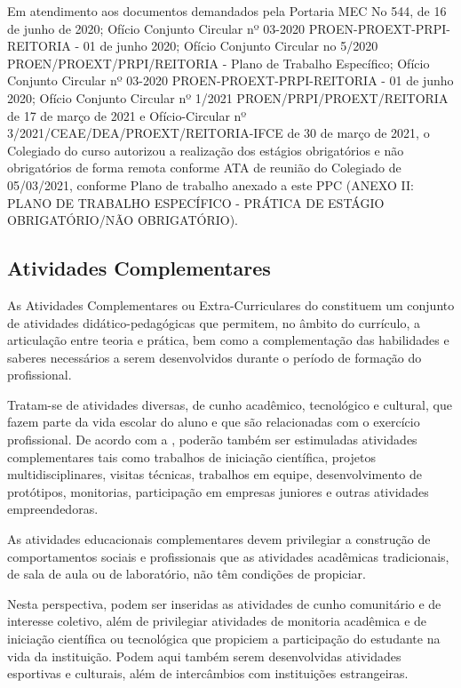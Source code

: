 Em atendimento aos documentos demandados pela Portaria MEC No 544, de 16 de junho de 2020; Ofício Conjunto Circular nº 03-2020 PROEN-PROEXT-PRPI-REITORIA - 01 de junho 2020; Ofício Conjunto Circular no 5/2020 PROEN/PROEXT/PRPI/REITORIA - Plano de Trabalho Específico; Ofício Conjunto Circular nº 03-2020 PROEN-PROEXT-PRPI-REITORIA - 01 de junho 2020; Ofício Conjunto Circular nº 1/2021 PROEN/PRPI/PROEXT/REITORIA de 17 de março de 2021 e Ofício-Circular nº 3/2021/CEAE/DEA/PROEXT/REITORIA-IFCE de 30 de março de 2021, o Colegiado do curso autorizou a realização dos estágios obrigatórios e não obrigatórios de forma remota conforme ATA de reunião do Colegiado de 05/03/2021, conforme Plano de trabalho anexado a este PPC (ANEXO II: PLANO DE TRABALHO ESPECÍFICO - PRÁTICA DE ESTÁGIO OBRIGATÓRIO/NÃO OBRIGATÓRIO).


\subsection{Atividades Complementares}

As Atividades Complementares ou Extra-Curriculares do \NOMECURSO constituem um conjunto de atividades didático-pedagógicas que permitem, no âmbito do currículo, a articulação entre teoria e prática, bem como a complementação das habilidades e saberes necessários a serem desenvolvidos durante o período de formação do profissional.

Tratam-se de atividades diversas, de cunho acadêmico, tecnológico e cultural, que fazem parte da vida escolar do aluno e que são relacionadas com o exercício profissional. De acordo com a , poderão também ser estimuladas atividades complementares tais como trabalhos de iniciação científica, projetos multidisciplinares, visitas técnicas, trabalhos em equipe, desenvolvimento de protótipos, monitorias, participação em empresas juniores e outras atividades empreendedoras.

As atividades educacionais complementares devem privilegiar a construção de comportamentos sociais e profissionais que as atividades acadêmicas tradicionais, de sala de aula ou de laboratório, não têm condições de propiciar.

Nesta perspectiva, podem ser inseridas as atividades de cunho comunitário e de interesse coletivo, além de privilegiar atividades de monitoria acadêmica e de iniciação científica ou tecnológica que propiciem a participação do estudante na vida da instituição. Podem aqui também serem desenvolvidas atividades esportivas e culturais, além de intercâmbios com instituições estrangeiras.


